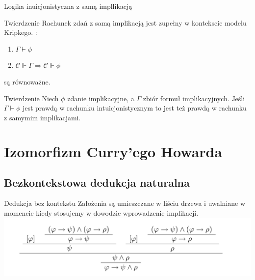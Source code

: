 \documentclass{beamer}
\begin{document}
\begin{frame}{Logika inuicjonistyczna z samą impllikacją}
 \begin{block}{Twierdzenie}
Rachunek zdań z samą implikacją jest zupełny w kontekscie modelu Kripkego. : 
\begin{enumerate}
\item \( \Gamma \vdash \phi \)
\item \( \mathcal{C} \Vdash \Gamma \Rightarrow \mathcal{C} \Vdash \phi \)
\end{enumerate}
są równoważne.
	
 \end{block}
 
  \begin{block}{Twierdzenie}
  Niech \(\phi\) zdanie implikacyjne, a \(\Gamma\) zbiór formuł implikacyjnych. Jeśli \( \Gamma \vdash \phi \) jest prawdą w rachunku intuicjonistycznym to jest też prawdą w rachunku z samymim implikacjami. 

 \end{block}
\end{frame}

\section{Izomorfizm Curry'ego Howarda}

\subsection{Bezkontekstowa dedukcja naturalna}
\begin{frame}{Dedukcja bez kontekstu}
Założenia są umieszczane w liściu drzewa i uwalniane w momencie kiedy stosujemy w dowodzie wprowadzenie implikacji.
\includegraphics[scale=0.25]{bezkontdedukcja.png}
\end{frame}
\end{document}
